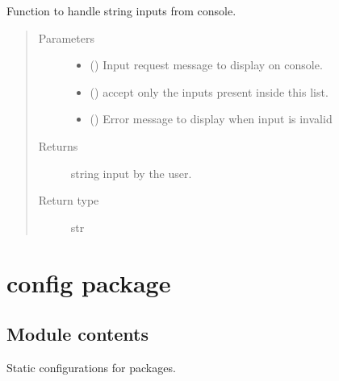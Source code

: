 \documentclass[letterpaper,10pt,english]{sphinxmanual}
\begin{document}
\begin{fulllineitems}
\label{\detokenize{docs/source/common:common.input_handler.get_input_str}}
Function to handle string inputs from console.
\begin{quote}\begin{description}
\item[{Parameters}] \leavevmode\begin{itemize}
\item {} 
 () \textendash{} Input request message to display on console.

\item {} 
 () \textendash{} accept only the inputs present inside this list.

\item {} 
 () \textendash{} Error message to display when input is invalid

\end{itemize}

\item[{Returns}] \leavevmode
string input by the user.

\item[{Return type}] \leavevmode
str

\end{description}\end{quote}

\end{fulllineitems}



\chapter{config package}
\label{\detokenize{docs/source/config:config-package}}\label{\detokenize{docs/source/config::doc}}

\section{Module contents}
\label{\detokenize{docs/source/config:module-config}}\label{\detokenize{docs/source/config:module-contents}}
Static configurations for packages.
\end{document}
